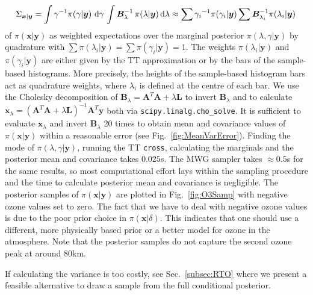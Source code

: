 \begin{align}
	\Sigma_{\bm{x}|\bm{y}} = \int \gamma^{-1}  \pi(\gamma | \bm{y} ) \, \mathop{}\!\mathrm{d} \gamma \, \int  \bm{B}_{\lambda}^{-1} \, \pi(\lambda | \bm{y} )  \, \text{d} \lambda  \approx \sum {\gamma_i}^{-1}\pi(\gamma_i| \bm{y}) \sum \bm{B}_{\lambda_i}^{-1}\pi(\lambda_i| \bm{y})\, \label{eq:CovInt}
\end{align}
of $\pi(\bm{x}| \bm{y})$ as weighted expectations over the marginal posterior $\pi(\lambda,\gamma | \bm{y})$ by quadrature \cite[Sec. 2.1]{Dick_Kuo_Sloan_2013} with $\sum \pi(\lambda_i| \bm{y}) = \sum \pi(\gamma_i| \bm{y}) = 1$.
The weights $\pi(\lambda_i| \bm{y})$ and $\pi(\gamma_i| \bm{y})$ are either given by the TT approximation or by the bars of the sample-based histograms.
More precisely, the heights of the sample-based histogram bars act as quadrature weights, where $\lambda_i$ is defined at the centre of each bar.
We use the Cholesky decomposition of $\bm{B}_{\lambda} = \bm{A}^T \bm{A} + \lambda \bm{L}$ to invert $\bm{B}_{\lambda}$ and to calculate $\bm{x}_{\lambda} = (\bm{A}^T \bm{A} + \lambda \bm{L} )^{-1} \bm{A}^T \bm{y}$ both via \texttt{scipy.linalg.cho\_solve}.
It is sufficient to evaluate $\bm{x}_{\lambda}$ and invert $\bm{B}_{\lambda}$ 20 times to obtain mean and covariance values of $\pi(\bm{x}|\bm{y})$ within a reasonable error (see Fig.~\ref{fig:MeanVarError}).
Finding the mode of $\pi(\lambda,\gamma|\bm{y})$, running the TT \texttt{cross}, calculating the marginals and the posterior mean and covariance takes $0.025$s.
The MWG sampler takes $\approx0.5$s for the same results, so most computational effort lays within the sampling procedure and the time to calculate posterior mean and covariance is negligible.
The posterior samples of $\pi(\bm{x}|\bm{y})$ are plotted in Fig.~\ref{fig:O3Samp} with negative ozone values set to zero.
The fact that we have to deal with negative ozone values is due to the poor prior choice in $\pi(\bm{x}|\delta)$.
This indicates that one should use a different, more physically based prior or a better model for ozone in the atmosphere.
Note that the posterior samples do not capture the second ozone peak at around $80$km.

If calculating the variance is too costly, see Sec.~\ref{subsec:RTO} where we present a feasible alternative to draw a sample from the full conditional posterior.


